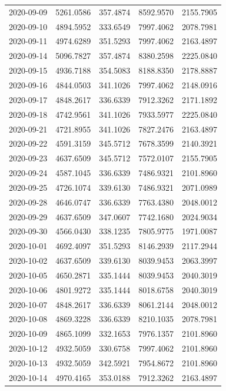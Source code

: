 {\begin{longtable}{lllll}
2020-09-09 & 5261.0586 & 357.4874 & 8592.9570 & 2155.7905 \\
2020-09-10 & 4894.5952 & 333.6549 & 7997.4062 & 2078.7981 \\
2020-09-11 & 4974.6289 & 351.5293 & 7997.4062 & 2163.4897 \\
2020-09-14 & 5096.7827 & 357.4874 & 8380.2598 & 2225.0840 \\
2020-09-15 & 4936.7188 & 354.5083 & 8188.8350 & 2178.8887 \\
2020-09-16 & 4844.0503 & 341.1026 & 7997.4062 & 2148.0916 \\
2020-09-17 & 4848.2617 & 336.6339 & 7912.3262 & 2171.1892 \\
2020-09-18 & 4742.9561 & 341.1026 & 7933.5977 & 2225.0840 \\
2020-09-21 & 4721.8955 & 341.1026 & 7827.2476 & 2163.4897 \\
2020-09-22 & 4591.3159 & 345.5712 & 7678.3599 & 2140.3921 \\
2020-09-23 & 4637.6509 & 345.5712 & 7572.0107 & 2155.7905 \\
2020-09-24 & 4587.1045 & 336.6339 & 7486.9321 & 2101.8960 \\
2020-09-25 & 4726.1074 & 339.6130 & 7486.9321 & 2071.0989 \\
2020-09-28 & 4646.0747 & 336.6339 & 7763.4380 & 2048.0012 \\
2020-09-29 & 4637.6509 & 347.0607 & 7742.1680 & 2024.9034 \\
2020-09-30 & 4566.0430 & 338.1235 & 7805.9775 & 1971.0087 \\
2020-10-01 & 4692.4097 & 351.5293 & 8146.2939 & 2117.2944 \\
2020-10-02 & 4637.6509 & 339.6130 & 8039.9453 & 2063.3997 \\
2020-10-05 & 4650.2871 & 335.1444 & 8039.9453 & 2040.3019 \\
2020-10-06 & 4801.9272 & 335.1444 & 8018.6758 & 2040.3019 \\
2020-10-07 & 4848.2617 & 336.6339 & 8061.2144 & 2048.0012 \\
2020-10-08 & 4869.3228 & 336.6339 & 8210.1035 & 2078.7981 \\
2020-10-09 & 4865.1099 & 332.1653 & 7976.1357 & 2101.8960 \\
2020-10-12 & 4932.5059 & 330.6758 & 7997.4062 & 2101.8960 \\
2020-10-13 & 4932.5059 & 342.5921 & 7954.8672 & 2101.8960 \\
2020-10-14 & 4970.4165 & 353.0188 & 7912.3262 & 2163.4897 \\

\end{longtable}}
